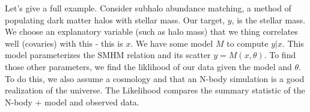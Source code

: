 \documentclass{article}
\begin{document}
Let's give a full example. Consider subhalo abundance matching, a method of populating dark matter halos with stellar mass. Our target, $y$, is the stellar mass. We choose an explanatory variable (such as halo mass) that we thing correlates well (covaries) with this - this is $x$.
We have some model $M$ to compute $y | x$. This model parameterizes the SMHM relation and its scatter $y = M(x, \theta)$.
To find those other parameters, we find the liklihood of our data given the model and $\theta$. To do this, we also assume a cosmology and that an N-body simulation is a good realization of the universe. The Likelihood compares the summary statistic of the N-body + model and observed data.
\end{document}
